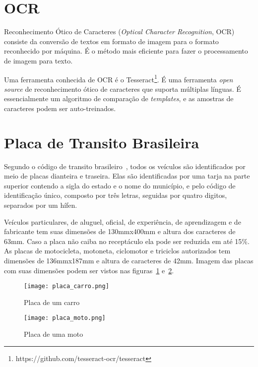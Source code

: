 \section{OCR}
\label{sec:ocr}

Reconhecimento Ótico de Caracteres (\emph{Optical Character Recognition}, OCR)
consiste da conversão de textos em formato de imagem para o formato reconhecido
por máquina. É o método mais eficiente para fazer o processamento de imagem para
texto.~\cite{mohit2015designing}

Uma ferramenta conhecida de OCR é o
Tesseract\footnote{https://github.com/tesseract-ocr/tesseract}. É uma ferramenta
\emph{open source} de reconhecimento ótico de caracteres que suporta múltiplas
línguas.  É essencialmente um algoritmo de comparação de \emph{templates}, e as
amostras de caracteres podem ser auto-treinados.~\cite{ho2016intelligent}

\section{Placa de Transito Brasileira}
\label{sec:placabr}

Segundo o código de transito brasileiro~\cite{brasil1997lei}, todos os veículos
são identificados por meio de placas dianteira e traseira. Elas são
identificadas por uma tarja na parte superior contendo a sigla do estado e o
nome do município, e pelo código de identificação único, composto por três
letras, seguidas por quatro digitos, separados por um hífen.

Veículos particulares, de aluguel, oficial, de experiência, de aprendizagem e de
fabricante tem suas dimensões de 130mmx400mm e altura dos caracteres de 63mm.
Caso a placa não caiba no receptáculo ela pode ser reduzida em até 15\%. As
placas de motocicleta, motoneta, ciclomotor e triciclos autorizados tem
dimensões de 136mmx187mm e altura de caracteres de 42mm. Imagem das placas com
suas dimensões podem ser vistos nas figuras~\ref{fig:placa_carro}
e~\ref{fig:placa_moto}.

\begin{figure}[H]
		\centering
		\texttt{[image: placa\_carro.png]}
		\caption{Placa de um carro}
		\label{fig:placa_carro}
\end{figure}

\begin{figure}[H]
		\centering
		\texttt{[image: placa\_moto.png]}
		\caption{Placa de uma moto}
		\label{fig:placa_moto}
\end{figure}

